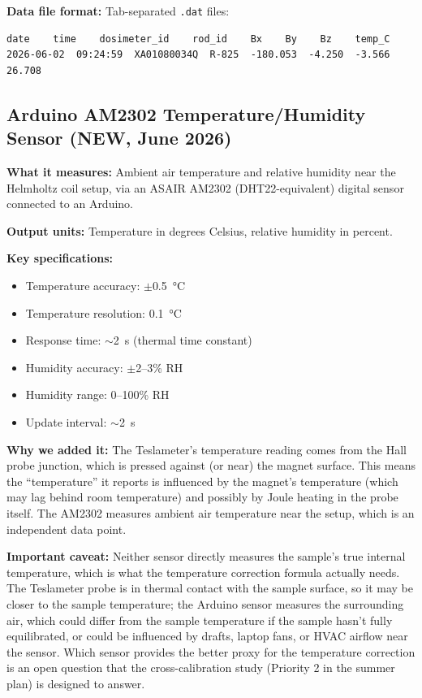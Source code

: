 \documentclass[11pt,letterpaper]{article}
\begin{document}
\textbf{Data file format:} Tab-separated \texttt{.dat} files:

\begin{lstlisting}
date    time    dosimeter_id    rod_id    Bx    By    Bz    temp_C
2026-06-02  09:24:59  XA01080034Q  R-825  -180.053  -4.250  -3.566  26.708
\end{lstlisting}

\subsection{Arduino AM2302 Temperature/Humidity Sensor (NEW, June 2026)}
\label{sec:arduino}

\textbf{What it measures:} Ambient air temperature and relative humidity near
the Helmholtz coil setup, via an ASAIR AM2302 (DHT22-equivalent) digital sensor
connected to an Arduino.

\textbf{Output units:} Temperature in degrees Celsius, relative humidity in
percent.

\textbf{Key specifications:}
\begin{itemize}[nosep]
  \item Temperature accuracy: $\pm$\SI{0.5}{\degreeCelsius}
  \item Temperature resolution: \SI{0.1}{\degreeCelsius}
  \item Response time: ${\sim}$\SI{2}{\second} (thermal time constant)
  \item Humidity accuracy: $\pm$2--3\% RH
  \item Humidity range: 0--100\% RH
  \item Update interval: ${\sim}$\SI{2}{\second}
\end{itemize}

\textbf{Why we added it:} The Teslameter's temperature reading comes from the
Hall probe junction, which is pressed against (or near) the magnet surface. This
means the ``temperature'' it reports is influenced by the magnet's temperature
(which may lag behind room temperature) and possibly by Joule heating in the
probe itself. The AM2302 measures ambient air temperature near the setup, which
is an independent data point.

\textbf{Important caveat:} Neither sensor directly measures the sample's true
internal temperature, which is what the temperature correction formula actually
needs. The Teslameter probe is in thermal contact with the sample surface, so it
may be closer to the sample temperature; the Arduino sensor measures the
surrounding air, which could differ from the sample temperature if the sample
hasn't fully equilibrated, or could be influenced by drafts, laptop fans, or
HVAC airflow near the sensor. Which sensor provides the better proxy for the
temperature correction is an open question that the cross-calibration study
(Priority 2 in the summer plan) is designed to answer.
\end{document}

